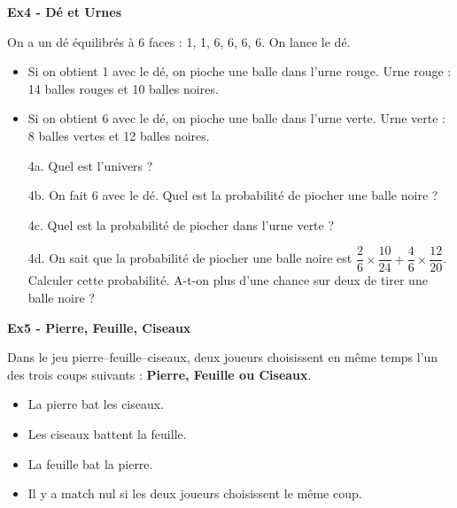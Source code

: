 \textbf{Ex4 - Dé et Urnes}

On a un dé équilibrés à 6 faces : 1, 1, 6, 6, 6, 6. On lance le dé. 

\begin{multicols}{2}\noindent
\begin{itemize}[label={$\bullet$}]
  \item Si on obtient 1 avec le dé, on pioche une balle dans l'urne rouge.
  Urne rouge : 14 balles rouges et 10 balles noires.

  \item Si on obtient 6 avec le dé, on pioche une balle dans l'urne verte.
  Urne verte : 8 balles vertes et 12 balles noires.
\end{itemize}
\end{multicols}

\begin{enumerate}
  \item[4a.] Quel est l'univers ? \\ \Pointilles[2] 
  \item[4b.] On fait 6 avec le dé. Quel est la probabilité de piocher une balle noire ? \\ \Pointilles[2] 
  \item[4c.] Quel est la probabilité de piocher dans l'urne verte ? \\ \Pointilles[2] 
  \item[4d.] On sait que la probabilité de piocher une balle noire est $\dfrac{2}{6} \times \dfrac{10}{24} + \dfrac{4}{6} \times \dfrac{12}{20}$. \\
  Calculer cette probabilité. A-t-on plus d'une chance sur deux de tirer une balle noire ? \\ \Pointilles[3] 
\end{enumerate}

\textbf{Ex5 - Pierre, Feuille, Ciseaux}

Dans le jeu pierre–feuille–ciseaux, deux joueurs choisissent en même temps l’un des trois coups suivants : \textbf{Pierre, Feuille ou Ciseaux}.

\begin{itemize}[label={$\bullet$}]
  \item La pierre bat les ciseaux.
  \item Les ciseaux battent la feuille. 
  \item La feuille bat la pierre.
  \item Il y a match nul si les deux joueurs choisissent le même coup.
\end{itemize}

